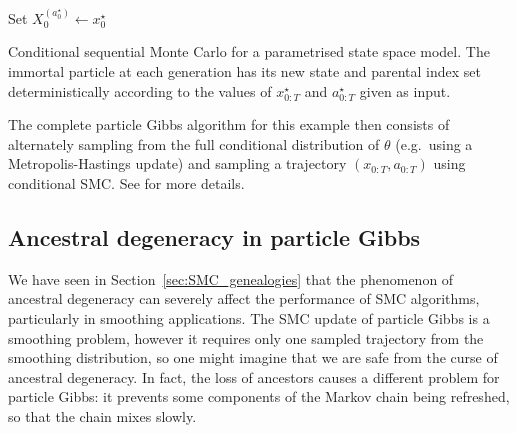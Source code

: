 \begin{algorithm}[ht]
\vspace*{10pt}
\DontPrintSemicolon
{}
Set $X_0^{(a_0^\star)} \gets x_0^\star$\;
\vspace*{10pt}
\caption[Conditional sequential Monte Carlo for a parametrised state space model]{Conditional sequential Monte Carlo for a parametrised state space model. The immortal particle at each generation has its new state and parental index set deterministically according to the values of $x_{0:T}^\star$ and $a_{0:T}^\star$ given as input.}
\label{alg:condSMC}
\end{algorithm}
The complete particle Gibbs algorithm for this example then consists of alternately sampling from the full conditional distribution of $\theta$ (e.g.\ using a Metropolis-Hastings update) and sampling a trajectory $(x_{0:T}, a_{0:T})$ using conditional SMC. See \textcite[Section 2.4.3]{andrieu2010} for more details.




\subsection{Ancestral degeneracy in particle Gibbs}
We have seen in Section~\ref{sec:SMC_genealogies} that the phenomenon of ancestral degeneracy can severely affect the performance of SMC algorithms, particularly in smoothing applications.
The SMC update of particle Gibbs is a smoothing problem, however it requires only one sampled trajectory from the smoothing distribution, so one might imagine that we are safe from the curse of ancestral degeneracy.
In fact, the loss of ancestors causes a different problem for particle Gibbs: it prevents some components of the Markov chain being refreshed, so that the chain mixes slowly.

